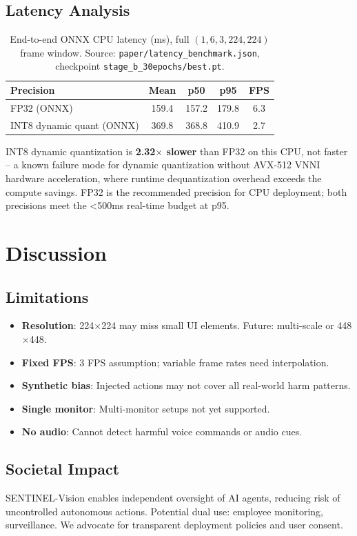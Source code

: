 \documentclass[11pt,a4paper]{article}
\begin{document}
\subsection{Latency Analysis}
\begin{table}[H]
\centering
\caption{End-to-end ONNX CPU latency (ms), full $(1,6,3,224,224)$ frame window. Source: \texttt{paper/latency\_benchmark.json}, checkpoint \texttt{stage\_b\_30epochs/best.pt}.}
\label{tab:latency}
\begin{tabular}{lcccc}
\toprule
Precision & Mean & p50 & p95 & FPS \\
\midrule
FP32 (ONNX) & 159.4 & 157.2 & 179.8 & 6.3 \\
INT8 dynamic quant (ONNX) & 369.8 & 368.8 & 410.9 & 2.7 \\
\bottomrule
\end{tabular}
\end{table}
INT8 dynamic quantization is \textbf{2.32$\times$ slower} than FP32 on this CPU, not faster -- a known
failure mode for dynamic quantization without AVX-512 VNNI hardware acceleration, where
runtime dequantization overhead exceeds the compute savings. FP32 is the recommended
precision for CPU deployment; both precisions meet the \textless 500ms real-time budget at p95.

\section{Discussion}

\subsection{Limitations}
\begin{itemize}
    \item \textbf{Resolution}: 224$\times$224 may miss small UI elements. Future: multi-scale or 448$\times$448.
    \item \textbf{Fixed FPS}: 3 FPS assumption; variable frame rates need interpolation.
    \item \textbf{Synthetic bias}: Injected actions may not cover all real-world harm patterns.
    \item \textbf{Single monitor}: Multi-monitor setups not yet supported.
    \item \textbf{No audio}: Cannot detect harmful voice commands or audio cues.
\end{itemize}

\subsection{Societal Impact}
SENTINEL-Vision enables independent oversight of AI agents, reducing risk of uncontrolled autonomous actions. Potential dual use: employee monitoring, surveillance. We advocate for transparent deployment policies and user consent.
\end{document}

